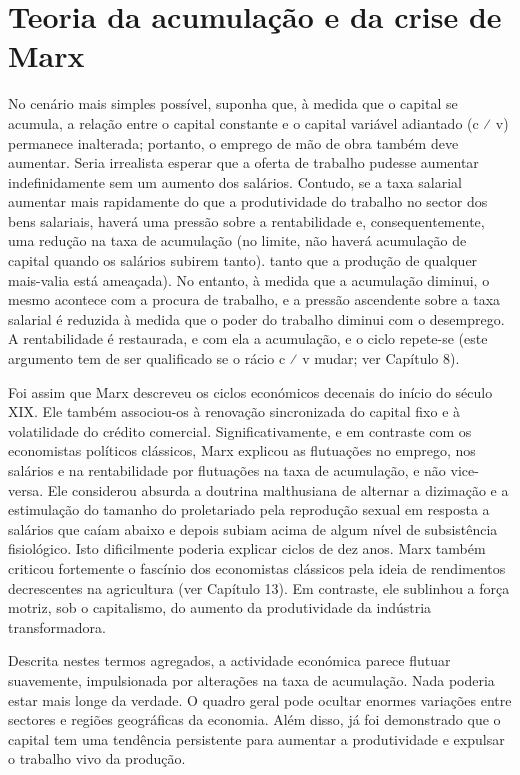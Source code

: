 \section{Teoria da acumulação e da crise de Marx}
 \par 
No cenário mais simples possível, suponha que, à medida que o capital se acumula, a relação entre o capital constante e o capital variável adiantado (c ⁄ v) permanece inalterada; portanto, o emprego de mão de obra também deve aumentar. Seria irrealista esperar que a oferta de trabalho pudesse aumentar indefinidamente sem um aumento dos salários. Contudo, se a taxa salarial aumentar mais rapidamente do que a produtividade do trabalho no sector dos bens salariais, haverá uma pressão sobre a rentabilidade e, consequentemente, uma redução na taxa de acumulação (no limite, não haverá acumulação de capital quando os salários subirem tanto). tanto que a produção de qualquer mais-valia está ameaçada). No entanto, à medida que a acumulação diminui, o mesmo acontece com a procura de trabalho, e a pressão ascendente sobre a taxa salarial é reduzida à medida que o poder do trabalho diminui com o desemprego. A rentabilidade é restaurada, e com ela a acumulação, e o ciclo repete-se (este argumento tem de ser qualificado se o rácio c ⁄ v mudar; ver Capítulo {\color{blue}8}).
 \par 
Foi assim que Marx descreveu os ciclos económicos decenais do início do século XIX. Ele também associou-os à renovação sincronizada do capital fixo e à volatilidade do crédito comercial. Significativamente, e em contraste com os economistas políticos clássicos, Marx explicou as flutuações no emprego, nos salários e na rentabilidade por flutuações na taxa de acumulação, e não vice-versa. Ele considerou absurda a doutrina malthusiana de alternar a dizimação e a estimulação do tamanho do proletariado pela reprodução sexual em resposta a salários que caíam abaixo e depois subiam acima de algum nível de subsistência fisiológico. Isto dificilmente poderia explicar ciclos de dez anos. Marx também criticou fortemente o fascínio dos economistas clássicos pela ideia de rendimentos decrescentes na agricultura (ver Capítulo {\color{blue}13}). Em contraste, ele sublinhou a força motriz, sob o capitalismo, do aumento da produtividade da indústria transformadora.
 \par 
Descrita nestes termos agregados, a actividade económica parece flutuar suavemente, impulsionada por alterações na taxa de acumulação. Nada poderia estar mais longe da verdade. O quadro geral pode ocultar enormes variações entre sectores e regiões geográficas da economia. Além disso, já foi demonstrado que o capital tem uma tendência persistente para aumentar a produtividade e expulsar o trabalho vivo da produção.
